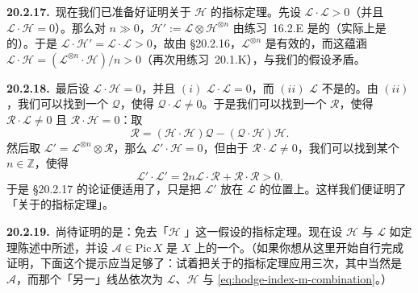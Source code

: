 \textbf{20.2.17.}\ 现在我们已准备好证明关于\trAmple{} $\mathscr{H}$ 的\trHodge{}指标定理。先设 $\mathscr{L}\cdot\mathscr{L}>0$（并且 $\mathscr{L}\cdot\mathscr{H}=0$）。那么对 $n\gg 0$，$\mathscr{H}':=\mathscr{L}\otimes\mathscr{H}^{\otimes n}$ 由\mbox{练习~16.2.E} 是\trAmple{}的（实际上是\trVeryAmple{}的）。于是 $\mathscr{L}\cdot\mathscr{H}'=\mathscr{L}\cdot\mathscr{L}>0$，故由 \S20.2.16，$\mathscr{L}^{\otimes n}$ 是有效的，而这蕴涵 $\mathscr{L}\cdot\mathscr{H}=(\mathscr{L}^{\otimes n}\cdot\mathscr{H})/n>0$（再次用\mbox{练习~20.1.K}），与我们的假设矛盾。

\textbf{20.2.18.}\ 最后设 $\mathscr{L}\cdot\mathscr{H}=0$，并且 $(i)$ $\mathscr{L}\cdot\mathscr{L}=0$，而 $(ii)$ $\mathscr{L}$ 不是\trNumericallyTrivial{}的。由 $(ii)$，我们可以找到一个\trInvertibleSheaf{} $\mathscr{Q}$，使得 $\mathscr{Q}\cdot\mathscr{L}\ne 0$。于是我们可以找到一个\trInvertibleSheaf{} $\mathscr{R}$，使得 $\mathscr{R}\cdot\mathscr{L}\ne 0$ 且 $\mathscr{R}\cdot\mathscr{H}=0$：取
\[
\mathscr{R}=(\mathscr{H}\cdot\mathscr{H})\mathscr{Q}-(\mathscr{Q}\cdot\mathscr{H})\mathscr{H}.
\]
然后取 $\mathscr{L}'=\mathscr{L}^{\otimes n}\otimes\mathscr{R}$，那么 $\mathscr{L}'\cdot\mathscr{H}=0$，但由于 $\mathscr{R}\cdot\mathscr{L}\ne 0$，我们可以找到某个 $n\in\mathbb{Z}$，使得
\[
\mathscr{L}'\cdot\mathscr{L}'=2n\mathscr{L}\cdot\mathscr{R}+\mathscr{R}\cdot\mathscr{R}>0.
\]
于是 \S20.2.17 的论证便适用了，只是把 $\mathscr{L}'$ 放在 $\mathscr{L}$ 的位置上。这样我们便证明了「关于\trAmple\trLineBundle{}的\trHodge{}指标定理」。

\textbf{20.2.19.}\ 尚待证明的是：免去「$\mathscr{H}$ \trAmple」这一假设的\trHodge{}指标定理。现在设 $\mathscr{H}$ 与 $\mathscr{L}$ 如定理陈述中所述，并设 $\mathscr{A}\in\mathrm{Pic}\,X$ 是 $X$ 上的一个\trAmple\trLineBundle。（如果你想从这里开始自行完成证明，下面这个提示应当足够了：试着把关于\trAmple\trLineBundle{}的\trHodge{}指标定理应用三次，其中\trAmple\trLineBundle{}当然是 $\mathscr{A}$，而那个「另一」线丛依次为 $\mathscr{L}$、$\mathscr{H}$ 与 \eqref{eq:hodge-index-m-combination}。）

